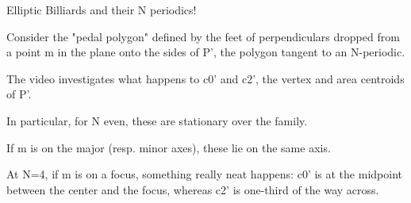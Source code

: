 Elliptic Billiards and their N periodics!

Consider the "pedal polygon" defined by the feet of perpendiculars dropped from a point m in the plane onto the sides of P', the polygon tangent to an N-periodic.

The video investigates what happens to c0' and c2', the vertex and area centroids of P'.

In particular, for N even, these are stationary over the family.

If m is on the major (resp. minor axes), these lie on the same axis.

At N=4, if m is on a focus, something really neat happens: c0' is at the midpoint between the center and the focus, whereas c2' is one-third of the way across.